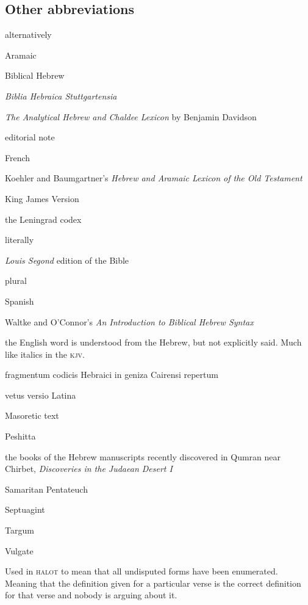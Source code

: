 \subsection{Other abbreviations}
\begin{description}[labelsep=3em, font=\normalfont, itemsep=-0.25em]
    \item[\textsc{alt}] alternatively
    \item[Aram.] Aramaic
    \item[\textsc{bh}] Biblical Hebrew
    \item[\textsc{bhs}] \textit{Biblia Hebraica Stuttgartensia}
    \item[Davidson] \textit{The Analytical Hebrew and Chaldee Lexicon} by Benjamin Davidson
    \item[\textsc{ed}] editorial note
    \item[Fr.] French
    \item[\textsc{halot}] Koehler and Baumgartner's \textit{Hebrew and Aramaic Lexicon of the Old Testament}
    \item[\textsc{kjv}] King James Version
    \item[L] the Leningrad codex
    \item[\textsc{lit}] literally
    \item[\textsc{lsg}] \textit{Louis Segond} edition of the Bible
    \item[pl.] plural
    \item[Sp.] Spanish
    \item [W\&O] Waltke and O'Connor's \textit{An Introduction to Biblical Hebrew Syntax}
    \item[\textdegree\dots$\mathscr{U}$] the English word is understood from the Hebrew, but not explicitly said. Much like italics in the \textsc{kjv}.
    \item[\fragheb] fragmentum codicis Hebraici in geniza Cairensi repertum
    \item[\latina] vetus versio Latina
    \item[\masoretic] Masoretic text
    \item[\peshitta] Peshitta
    \item[\qumran] the books of the Hebrew manuscripts recently discovered in Qumran near Chirbet, \textit{Discoveries in the Judaean Desert I}
    \item[\sampen] Samaritan Pentateuch
    \item[\septuagint] Septuagint
    \item[\targum] Targum
    \item[\vulgate] Vulgate
    \item[$\dagger$] Used in \textsc{halot} to mean that all undisputed forms have been enumerated. Meaning that the definition given for a particular verse is the correct definition for that verse and nobody is arguing about it.
\end{description}

